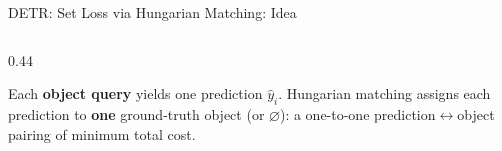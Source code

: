\begin{frame}{DETR: Set Loss via Hungarian Matching: Idea}
\begin{columns}[T]
\begin{column}{0.44\textwidth}
\begin{center}
      \end{center}
      \vspace{0.2em}
      {\footnotesize Each \textbf{object query} yields one prediction $\hat y_i$. Hungarian matching assigns each prediction to \textbf{one} ground-truth object (or $\varnothing$): a one-to-one prediction$\leftrightarrow$object pairing of minimum total cost.}
    \end{column}
  \end{columns}
\end{frame}

